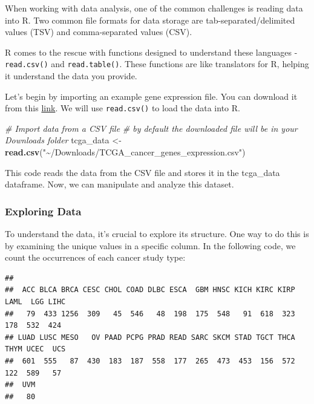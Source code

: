 \documentclass[
]{book}
\newenvironment{Shaded}{\begin{snugshade}}{\end{snugshade}}
\newcommand{\CommentTok}[1]{\textcolor[rgb]{0.56,0.35,0.01}{\textit{#1}}}
\newcommand{\FunctionTok}[1]{\textcolor[rgb]{0.13,0.29,0.53}{\textbf{#1}}}
\newcommand{\NormalTok}[1]{#1}
\newcommand{\OtherTok}[1]{\textcolor[rgb]{0.56,0.35,0.01}{#1}}
\newcommand{\SpecialCharTok}[1]{\textcolor[rgb]{0.81,0.36,0.00}{\textbf{#1}}}
\newcommand{\StringTok}[1]{\textcolor[rgb]{0.31,0.60,0.02}{#1}}
\begin{document}
When working with data analysis, one of the common challenges is reading data into R. Two common file formats for data storage are tab-separated/delimited values (TSV) and comma-separated values (CSV).

R comes to the rescue with functions designed to understand these languages - \texttt{read.csv()} and \texttt{read.table()}. These functions are like translators for R, helping it understand the data you provide.

Let's begin by importing an example gene expression file. You can download it from this \href{https://osf.io/yeun5}{link}. We will use \texttt{read.csv()} to load the data into R.

\begin{Shaded}
\begin{Highlighting}[]
\CommentTok{\# Import data from a CSV file}
\CommentTok{\# by default the downloaded file will be in your Downloads folder}
\NormalTok{tcga\_data }\OtherTok{\textless{}{-}} \FunctionTok{read.csv}\NormalTok{(}\StringTok{"\textasciitilde{}/Downloads/TCGA\_cancer\_genes\_expression.csv"}\NormalTok{)}
\end{Highlighting}
\end{Shaded}

This code reads the data from the CSV file and stores it in the tcga\_data dataframe. Now, we can manipulate and analyze this dataset.

\hypertarget{exploring-data}{%
\subsubsection{Exploring Data}\label{exploring-data}}

To understand the data, it's crucial to explore its structure. One way to do this is by examining the unique values in a specific column. In the following code, we count the occurrences of each cancer study type:

\begin{Shaded}
\end{Shaded}

\begin{verbatim}
## 
##  ACC BLCA BRCA CESC CHOL COAD DLBC ESCA  GBM HNSC KICH KIRC KIRP LAML  LGG LIHC 
##   79  433 1256  309   45  546   48  198  175  548   91  618  323  178  532  424 
## LUAD LUSC MESO   OV PAAD PCPG PRAD READ SARC SKCM STAD TGCT THCA THYM UCEC  UCS 
##  601  555   87  430  183  187  558  177  265  473  453  156  572  122  589   57 
##  UVM 
##   80
\end{verbatim}
\end{document}
